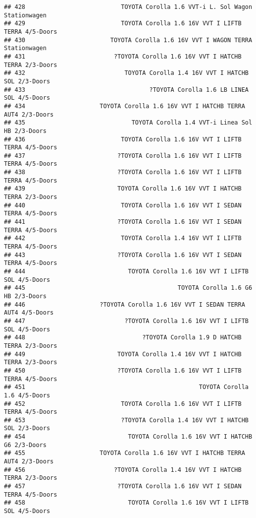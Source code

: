 \documentclass[]{article}
\begin{document}
\begin{verbatim}
## 428                           TOYOTA Corolla 1.6 VVT-i L. Sol Wagon Stationwagen
## 429                           TOYOTA Corolla 1.6 16V VVT I LIFTB TERRA 4/5-Doors
## 430                        TOYOTA Corolla 1.6 16V VVT I WAGON TERRA Stationwagen
## 431                         ?TOYOTA Corolla 1.6 16V VVT I HATCHB TERRA 2/3-Doors
## 432                            TOYOTA Corolla 1.4 16V VVT I HATCHB SOL 2/3-Doors
## 433                                   ?TOYOTA Corolla 1.6 LB LINEA SOL 4/5-Doors
## 434                     TOYOTA Corolla 1.6 16V VVT I HATCHB TERRA AUT4 2/3-Doors
## 435                              TOYOTA Corolla 1.4 VVT-i Linea Sol HB 2/3-Doors
## 436                           TOYOTA Corolla 1.6 16V VVT I LIFTB TERRA 4/5-Doors
## 437                          ?TOYOTA Corolla 1.6 16V VVT I LIFTB TERRA 4/5-Doors
## 438                          ?TOYOTA Corolla 1.6 16V VVT I LIFTB TERRA 4/5-Doors
## 439                          TOYOTA Corolla 1.6 16V VVT I HATCHB TERRA 2/3-Doors
## 440                           TOYOTA Corolla 1.6 16V VVT I SEDAN TERRA 4/5-Doors
## 441                          ?TOYOTA Corolla 1.6 16V VVT I SEDAN TERRA 4/5-Doors
## 442                           TOYOTA Corolla 1.4 16V VVT I LIFTB TERRA 4/5-Doors
## 443                          ?TOYOTA Corolla 1.6 16V VVT I SEDAN TERRA 4/5-Doors
## 444                             TOYOTA Corolla 1.6 16V VVT I LIFTB SOL 4/5-Doors
## 445                                           TOYOTA Corolla 1.6 G6 HB 2/3-Doors
## 446                     ?TOYOTA Corolla 1.6 16V VVT I SEDAN TERRA AUT4 4/5-Doors
## 447                            ?TOYOTA Corolla 1.6 16V VVT I LIFTB SOL 4/5-Doors
## 448                                 ?TOYOTA Corolla 1.9 D HATCHB TERRA 2/3-Doors
## 449                          TOYOTA Corolla 1.4 16V VVT I HATCHB TERRA 2/3-Doors
## 450                          ?TOYOTA Corolla 1.6 16V VVT I LIFTB TERRA 4/5-Doors
## 451                                                 TOYOTA Corolla 1.6 4/5-Doors
## 452                           TOYOTA Corolla 1.6 16V VVT I LIFTB TERRA 4/5-Doors
## 453                           ?TOYOTA Corolla 1.4 16V VVT I HATCHB SOL 2/3-Doors
## 454                             TOYOTA Corolla 1.6 16V VVT I HATCHB G6 2/3-Doors
## 455                     TOYOTA Corolla 1.6 16V VVT I HATCHB TERRA AUT4 2/3-Doors
## 456                         ?TOYOTA Corolla 1.4 16V VVT I HATCHB TERRA 2/3-Doors
## 457                          ?TOYOTA Corolla 1.6 16V VVT I SEDAN TERRA 4/5-Doors
## 458                             TOYOTA Corolla 1.6 16V VVT I LIFTB SOL 4/5-Doors

\end{verbatim}
\end{document}
